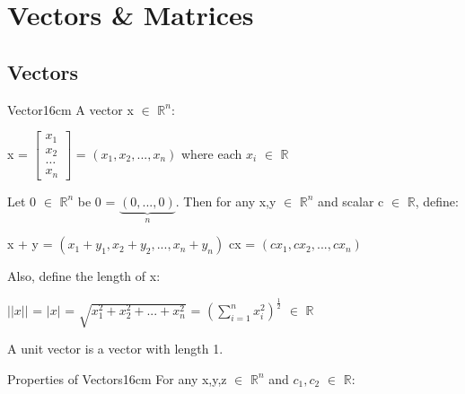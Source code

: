 \newpage

\section[Day 1: Vectors \& Matrices]{ Vectors \& Matrices }

\subsection{ Vectors }

    \begin{definition}{Vector}{16cm}
        A {\color{lblue} vector} x $\in$ $\mathbb{R}^n$:

        \hspace{0.5cm}
        x =
        $\begin{bmatrix}
            x_1 \\
            x_2 \\
            \hdots \\
            x_n
        \end{bmatrix}$
        = $(x_1,x_2,...,x_n)$
        \hspace{0.5cm}
        where each $x_i$ $\in$ $\mathbb{R}$

        Let 0 $\in$ $\mathbb{R}^n$ be 0 = $\underbrace{(0,...,0)}_n$.
        Then for any x,y $\in$ $\mathbb{R}^n$ and scalar c $\in$ $\mathbb{R}$,
        define:

        \hspace{0.5cm}
        x + y = $(x_1 + y_1 , x_2 + y_2 , ... , x_n + y_n)$
        \hspace{1cm}
        cx = $(cx_1 , cx_2 , ... , cx_n)$

        Also, define the {\color{lblue} length} of x:

        \hspace{0.5cm}
        $||x||$ = $|x|$ = $\sqrt{x_1^2 + x_2^2 + ... + x_n^2}$
        = $(\sum_{i=1}^n x_i^2)^{\frac{1}{2}}$
        $\in$ $\mathbb{R}$

        A {\color{lblue} unit vector} is a vector with length 1.
    \end{definition}

    \vspace{0.5cm}



    \begin{wtheorem}{Properties of Vectors}{16cm}
        For any x,y,z $\in$ $\mathbb{R}^n$ and $c_1,c_2$ $\in$ $\mathbb{R}$:
    \end{wtheorem}

